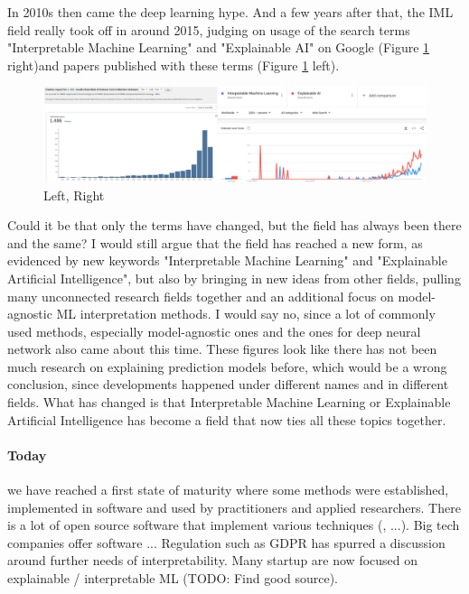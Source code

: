 \documentclass[runningheads]{llncs}
\begin{document}
In 2010s then came the deep learning hype.
And a few years after that, the IML field really took off in around 2015, judging on usage of the search terms "Interpretable Machine Learning" and "Explainable AI" on Google (Figure \ref{fig:count} right)and papers published with these terms (Figure \ref{fig:count} left).
\begin{figure}
  \includegraphics[width=\textwidth]{citation-search.png}
  \caption{Left, Right}
  \label{fig:count}
\end{figure}
Could it be that only the terms have changed, but the field has always been there and the same?
I would still argue that the field has reached a new form, as evidenced by new keywords "Interpretable Machine Learning" and "Explainable Artificial Intelligence", but also by bringing in new ideas from other fields, pulling many unconnected research fields together and an additional focus on model-agnostic ML interpretation methods.
I would say no, since a lot of commonly used methods, especially model-agnostic ones and the ones for deep neural network also came about this time.
These figures look like there has not been much research on explaining prediction models before, which would be a wrong conclusion, since developments happened under different names and in different fields.
What has changed is that Interpretable Machine Learning or Explainable Artificial Intelligence has become a field that now ties all these topics together.


\paragraph{Today} we have reached a first state of maturity where some methods were established, implemented in software and used by practitioners and applied researchers.
There is a lot of open source software that implement various techniques (\cite{iml,biecek2018dalex,pedregosa2011scikit,klaise2020alibi,nori2019interpretml}, ...).
Big tech companies offer software \cite{exler2019if,arya2020ai,hall2017machine}...
Regulation such as GDPR has spurred a discussion around further needs of interpretability.
Many startup are now focused on explainable / interpretable ML (TODO: Find good source).
\end{document}
